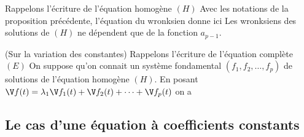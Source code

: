 \begin{prop}
Rappelons l'écriture de l'équation homogène $(H)$
Avec les notations de la proposition précédente, l'équation du wronksien donne ici
\nb Les wronksiens des solutions de $(H)$ ne dépendent que de la fonction $a_{p-1}$.\endnb
\end{prop}

\begin{prop}(Sur la variation des constantes)
Rappelons l'écriture de l'équation complète $(E)$
On suppose qu'on connait un système fondamental $(f_1,f_2,\ldots,f_p)$ de solutions de l'équation homogène $(H)$. En posant
$\V f(t)=\lambda_1 \V f_1(t)+\V f_2(t)+\cdots+\V f_p(t)$ on a
\end{prop}

\subsection{Le cas d'une équation à coefficients constants}

